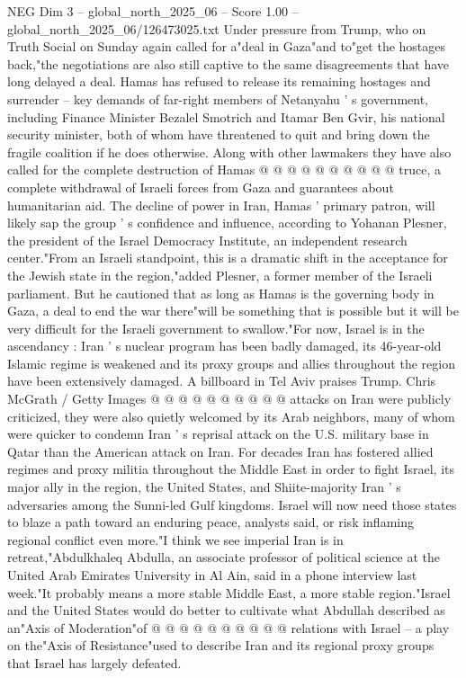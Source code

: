 \begin{textsample}{NEG Dim 3 – global\_north\_2025\_06 – Score 1.00 – global\_north\_2025\_06/126473025.txt}
Under pressure from Trump, who on Truth Social on Sunday again called for a"deal in Gaza"and to"get the hostages back,"the negotiations are also still captive to the same disagreements that have long delayed a deal.
Hamas has refused to release its remaining hostages and surrender -- key demands of far-right members of Netanyahu ' s government, including Finance Minister Bezalel Smotrich and Itamar Ben Gvir, his national security minister, both of whom have threatened to quit and bring down the fragile coalition if he does otherwise.
Along with other lawmakers they have also called for the complete destruction of Hamas @ @ @ @ @ @ @ @ @ @ truce, a complete withdrawal of Israeli forces from Gaza and guarantees about humanitarian aid.
The decline of power in Iran, Hamas ' primary patron, will likely sap the group ' s confidence and influence, according to Yohanan Plesner, the president of the Israel Democracy Institute, an independent research center."From an Israeli standpoint, this is a dramatic shift in the acceptance for the Jewish state in the region,"added Plesner, a former member of the Israeli parliament.
But he cautioned that as long as Hamas is the governing body in Gaza, a deal to end the war there"will be something that is possible but it will be very difficult for the Israeli government to swallow."For now, Israel is in the ascendancy : Iran ' s nuclear program has been badly damaged, its 46-year-old Islamic regime is weakened and its proxy groups and allies throughout the region have been extensively damaged.
A billboard in Tel Aviv praises Trump.
Chris McGrath / Getty Images @ @ @ @ @ @ @ @ @ @ attacks on Iran were publicly criticized, they were also quietly welcomed by its Arab neighbors, many of whom were quicker to condemn Iran ' s reprisal attack on the U.S. military base in Qatar than the American attack on Iran.
For decades Iran has fostered allied regimes and proxy militia throughout the Middle East in order to fight Israel, its major ally in the region, the United States, and Shiite-majority Iran ' s adversaries among the Sunni-led Gulf kingdoms.
Israel will now need those states to blaze a path toward an enduring peace, analysts said, or risk inflaming regional conflict even more."I think we see imperial Iran is in retreat,"Abdulkhaleq Abdulla, an associate professor of political science at the United Arab Emirates University in Al Ain, said in a phone interview last week."It probably means a more stable Middle East, a more stable region."Israel and the United States would do better to cultivate what Abdullah described as an"Axis of Moderation"of @ @ @ @ @ @ @ @ @ @ relations with Israel -- a play on the"Axis of Resistance"used to describe Iran and its regional proxy groups that Israel has largely defeated.

\end{textsample}

